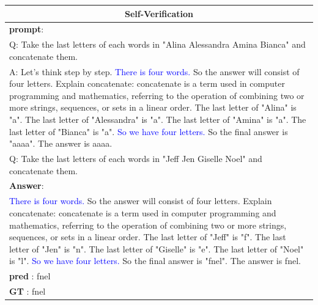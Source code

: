 \documentclass[11pt]{article}
\begin{document}
\begin{table}[htbp]
\begin{tabularx}{\textwidth}{X}
    \toprule
    \multicolumn{1}{c}{\textbf{Self-Verification}} \\
    \midrule
\textbf{prompt}: \\
Q: Take the last letters of each words in "Alina Alessandra Amina Bianca" and concatenate them.\\
A: Let's think step by step. \textcolor{blue} {There is four words.} So the answer will consist of four letters. Explain concatenate: concatenate is a term used in computer programming and mathematics, referring to the operation of combining two or more strings, sequences, or sets in a linear order. The last letter of "Alina" is "a". The last letter of "Alessandra" is "a". The last letter of "Amina" is "a". The last letter of "Bianca" is "a". \textcolor{blue} {So we have four letters.} So the final answer is "aaaa". The answer is aaaa.\\
Q: Take the last letters of each words in "Jeff Jen Giselle Noel" and concatenate them.\\
        \midrule
\textbf{Answer}:\\
 \textcolor{blue}{There is four words.} So the answer will consist of four letters. Explain concatenate: concatenate is a term used in computer programming and mathematics, referring to the operation of combining two or more strings, sequences, or sets in a linear order. The last letter of "Jeff" is "f". The last letter of "Jen" is "n". The last letter of "Giselle" is "e". The last letter of "Noel" is "l".  \textcolor{blue}{So we have four letters.} So the final answer is "fnel". The answer is fnel.\\
\textbf{pred} : fnel\\
\textbf{GT} : fnel\\


\end{tabularx}
\end{table}
\end{document}
